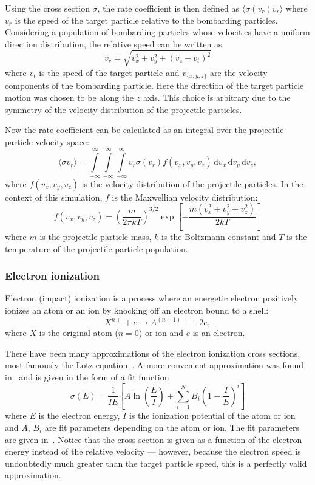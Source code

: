 \documentclass[a4paper,twoside,12pt]{article}
\begin{document}
Using the cross section $\sigma$, the rate coefficient is then defined as $\langle \sigma(v_r) v_r \rangle$ where $v_r$ is the speed of the target particle relative to the bombarding particles. Considering a population of bombarding particles whose velocities have a uniform direction distribution, the relative speed can be written as
\begin{equation}
    v_r = \sqrt{v_x^2 + v_y^2 + (v_z - v_t)^2}
\end{equation}
where $v_t$ is the speed of the target particle and $v_{\{x, y, z\}}$ are the velocity components of the bombarding particle. Here the direction of the target particle motion was chosen to be along the $z$ axis. This choice is arbitrary due to the symmetry of the velocity distribution of the projectile particles.

Now the rate coefficient can be calculated as an integral over the projectile particle velocity space:
\begin{equation}
    \label{eq:ratecoeff}
    \langle \sigma v_r \rangle = \int\limits_{-\infty}^\infty \int\limits_{-\infty}^\infty \int\limits_{-\infty}^\infty v_r \sigma(v_r) f(v_x, v_y, v_z)\,\mathrm{d}v_x\,\mathrm{d}v_y\,\mathrm{d}v_z,
\end{equation}
where $f(v_x, v_y, v_z)$ is the velocity distribution of the projectile particles. In the context of this simulation, $f$ is the Maxwellian velocity distribution:
\begin{equation}
    f(v_x, v_y, v_z) = \left(\frac{m}{2\pi kT}\right)^{3/2} \exp \left[ -\frac{m(v_x^2 + v_y^2 + v_z^2)}{2kT} \right]
\end{equation}
where $m$ is the projectile particle mass, $k$ is the Boltzmann constant and $T$ is the temperature of the projectile particle population.

\subsubsection{Electron ionization}
Electron (impact) ionization is a process where an energetic electron positively ionizes an atom or an ion by knocking off an electron bound to a shell:
\[
    X^{n+} + e \rightarrow A^{(n+1)+} + 2e,
\]
where $X$ is the original atom ($n=0$) or ion and $e$ is an electron.

There have been many approximations of the electron ionization cross sections, most famously the Lotz equation~\cite{lotz}. A more convenient approximation was found in~\cite{recommended_ionization} and is given in the form of a fit function
\begin{equation}
    \label{eq:ionization_fit}
    \sigma(E) = \frac{1}{IE} \left[ A \ln \left(\frac{E}{I}\right) + \sum\limits_{i=1}^N
    B_i \left(1-\frac{I}{E}\right)^i \right]
\end{equation}
where $E$ is the electron energy, $I$ is the ionization potential of the atom or ion and $A$, $B_i$ are fit parameters depending on the atom or ion. The fit parameters are given in~\cite{recommended_ionization}. Notice that the cross section is given as a function of the electron energy instead of the relative velocity --- however, because the electron speed is undoubtedly much greater than the target particle speed, this is a perfectly valid approximation.
\end{document}
